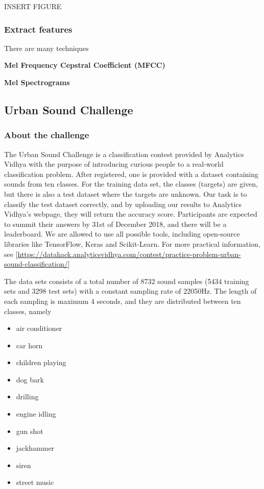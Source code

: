 INSERT FIGURE

\subsubsection{Extract features}
There are many techniques 

\textbf{Mel Frequency Cepstral Coefficient (MFCC)}


\textbf{Mel Spectrograms}


\subsection{Urban Sound Challenge}
\subsubsection{About the challenge}
The Urban Sound Challenge is a classification contest provided by Analytics Vidhya with the purpose of introducing curious people to a real-world classification problem. After registered, one is provided with a dataset containing sounds from ten classes. For the training data set, the classes (targets) are given, but there is also a test dataset where the targets are unknown. Our task is to classify the test dataset correctly, and by uploading our results to Analytics Vidhya's webpage, they will return the accuracy score. Participants are expected to summit their answers by 31st of December 2018, and there will be a leaderboard. We are allowed to use all possible tools, including open-source libraries like TensorFlow, Keras and Scikit-Learn. For more practical information, see [\url{https://datahack.analyticsvidhya.com/contest/practice-problem-urban-sound-classification/}]

The data sets consists of a total number of 8732 sound samples (5434 training sets and 3298 test sets) with a constant sampling rate of 22050Hz. The length of each sampling is maximum 4 seconds, and they are distributed between ten classes, namely
\begin{multicols}{2}
\begin{itemize}
	\setlength\itemsep{0.2em}
	\item air conditioner
	\item car horn
	\item children playing
	\item dog bark
	\item drilling
\end{itemize}

\columnbreak

\begin{itemize}
	\setlength\itemsep{0.2em}
	\item engine idling
	\item gun shot
	\item jackhammer
	\item siren
	\item street music
\end{itemize}
\end{multicols}

